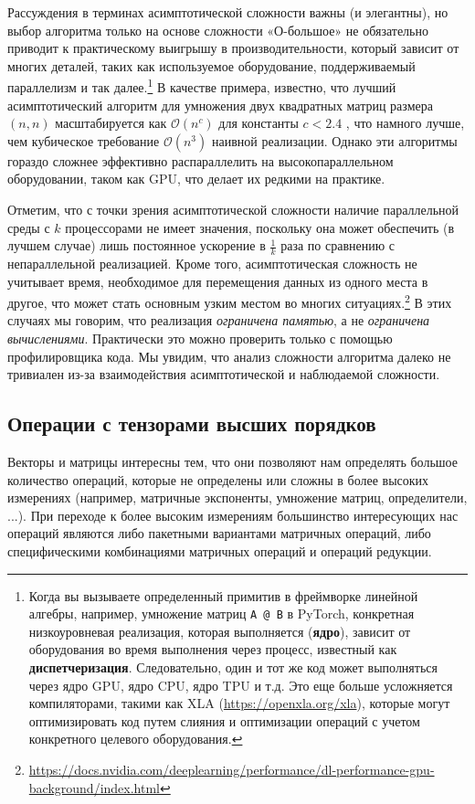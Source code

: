 Рассуждения в терминах асимптотической сложности важны (и элегантны), но выбор алгоритма только на основе сложности «О-большое» не обязательно приводит к практическому выигрышу в производительности, который зависит от многих деталей, таких как используемое оборудование, поддерживаемый параллелизм и так далее.\footnote{Когда вы вызываете определенный примитив в фреймворке линейной алгебры, например, умножение матриц \texttt{A @ B} в PyTorch, конкретная низкоуровневая реализация, которая выполняется (\textbf{ядро}), зависит от оборудования во время выполнения через процесс, известный как \textbf{диспетчеризация}. Следовательно, один и тот же код может выполняться через ядро GPU, ядро CPU, ядро TPU и т.д. Это еще больше усложняется компиляторами, такими как XLA (\url{https://openxla.org/xla}), которые могут оптимизировать код путем слияния и оптимизации операций с учетом конкретного целевого оборудования.} В качестве примера, известно, что лучший асимптотический алгоритм для умножения двух квадратных матриц размера $(n,n)$ масштабируется как $\mathcal{O}(n^c)$ для константы $c < 2.4$ \cite{coppersmith1982asymptotic}, что намного лучше, чем кубическое требование $\mathcal{O}(n^3)$ наивной реализации. Однако эти алгоритмы гораздо сложнее эффективно распараллелить на высокопараллельном оборудовании, таком как GPU, что делает их редкими на практике.

Отметим, что с точки зрения асимптотической сложности наличие параллельной среды с $k$ процессорами не имеет значения, поскольку она может обеспечить (в лучшем случае) лишь постоянное ускорение в $\frac{1}{k}$ раза по сравнению с непараллельной реализацией. Кроме того, асимптотическая сложность не учитывает время, необходимое для перемещения данных из одного места в другое, что может стать основным узким местом во многих ситуациях.\footnote{\url{https://docs.nvidia.com/deeplearning/performance/dl-performance-gpu-background/index.html}} В этих случаях мы говорим, что реализация \textit{ограничена памятью}, а не \textit{ограничена вычислениями}. Практически это можно проверить только с помощью профилировщика кода. Мы увидим, что анализ сложности алгоритма далеко не тривиален из-за взаимодействия асимптотической и наблюдаемой сложности.

\subsection{Операции с тензорами высших порядков}

Векторы и матрицы интересны тем, что они позволяют нам определять большое количество операций, которые не определены или сложны в более высоких измерениях (например, матричные экспоненты, умножение матриц, определители, ...). При переходе к более высоким измерениям большинство интересующих нас операций являются либо пакетными вариантами матричных операций, либо специфическими комбинациями матричных операций и операций редукции.


